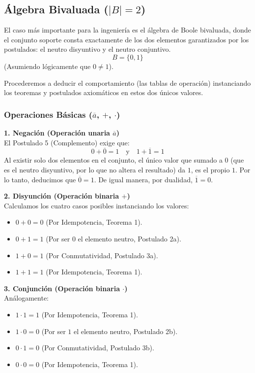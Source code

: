 \subsection{Álgebra Bivaluada ($|B| = 2$)}
El caso más importante para la ingeniería es el álgebra de Boole bivaluada, donde el conjunto soporte consta exactamente de los dos elementos garantizados por los postulados: el neutro disyuntivo y el neutro conjuntivo. 
\[ B = \{ 0, 1 \} \]
(Asumiendo lógicamente que $0 \neq 1$).

Procederemos a deducir el comportamiento (las tablas de operación) instanciando los teoremas y postulados axiomáticos en estos dos únicos valores.

\subsubsection{Operaciones Básicas ($\overline{a}$, $+$, $\cdot$)}

\textbf{1. Negación (Operación unaria $\overline{a}$)} \\
El Postulado 5 (Complemento) exige que:
\[ 0 + \overline{0} = 1 \quad \text{y} \quad 1 + \overline{1} = 1 \]
Al existir solo dos elementos en el conjunto, el único valor que sumado a $0$ (que es el neutro disyuntivo, por lo que no altera el resultado) da $1$, es el propio $1$. Por lo tanto, deducimos que $\overline{0} = 1$. De igual manera, por dualidad, $\overline{1} = 0$.

\textbf{2. Disyunción (Operación binaria $+$)} \\
Calculamos los cuatro casos posibles instanciando los valores:
\begin{itemize}
    \item $0 + 0 = 0$ (Por Idempotencia, Teorema 1).
    \item $0 + 1 = 1$ (Por ser $0$ el elemento neutro, Postulado 2a).
    \item $1 + 0 = 1$ (Por Conmutatividad, Postulado 3a).
    \item $1 + 1 = 1$ (Por Idempotencia, Teorema 1).
\end{itemize}

\textbf{3. Conjunción (Operación binaria $\cdot$)} \\
Análogamente:
\begin{itemize}
    \item $1 \cdot 1 = 1$ (Por Idempotencia, Teorema 1).
    \item $1 \cdot 0 = 0$ (Por ser $1$ el elemento neutro, Postulado 2b).
    \item $0 \cdot 1 = 0$ (Por Conmutatividad, Postulado 3b).
    \item $0 \cdot 0 = 0$ (Por Idempotencia, Teorema 1).
\end{itemize}

